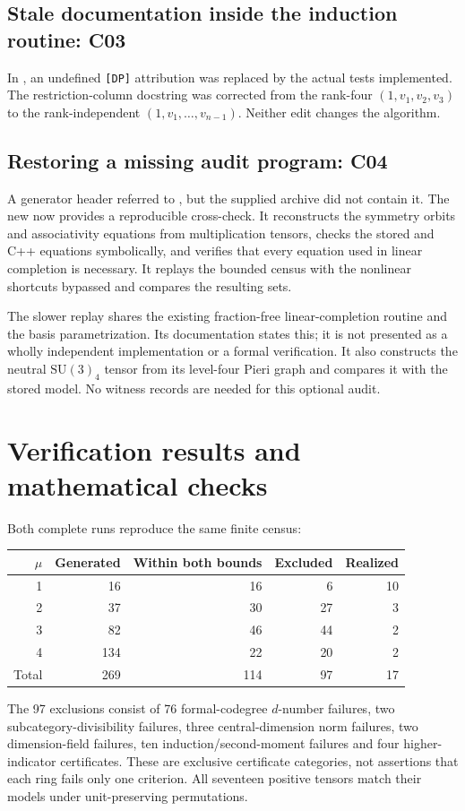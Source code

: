 \documentclass[11pt,a4paper]{article}
\begin{document}
\subsection{Stale documentation inside the induction routine: C03}

In , an undefined
\texttt{[DP]} attribution was replaced by the actual tests implemented.
The restriction-column docstring was corrected from the rank-four
$(1,v_1,v_2,v_3)$ to the rank-independent
$(1,v_1,\ldots,v_{n-1})$. Neither edit changes the algorithm.

\subsection{Restoring a missing audit program: C04}

A generator header referred to ,
but the supplied archive did not contain it. The new
 now provides a
reproducible cross-check. It reconstructs the symmetry orbits and
associativity equations from multiplication tensors, checks the stored
and C++ equations symbolically, and verifies that every equation used
in linear completion is necessary. It replays the bounded census with
the nonlinear shortcuts bypassed and compares the resulting sets.

The slower replay shares the existing fraction-free linear-completion
routine and the basis parametrization. Its documentation states this;
it is not presented as a wholly independent implementation or a formal
verification. It also constructs the neutral $\mathrm{SU}(3)_4$ tensor
from its level-four Pieri graph and compares it with the stored model.
No witness records are needed for this optional audit.

\section{Verification results and mathematical checks}

Both complete runs reproduce the same finite census:
\begin{center}
\begin{tabular}{@{}rrrrr@{}}
\toprule
$\mu$ & Generated & Within both bounds & Excluded & Realized\\\midrule
1&16&16&6&10\\
2&37&30&27&3\\
3&82&46&44&2\\
4&134&22&20&2\\\midrule
Total&269&114&97&17\\\bottomrule
\end{tabular}
\end{center}
The 97 exclusions consist of 76 formal-codegree $d$-number failures,
two subcategory-divisibility failures, three central-dimension norm
failures, two dimension-field failures, ten induction/second-moment
failures and four higher-indicator certificates. These are exclusive
certificate categories, not assertions that each ring fails only one
criterion. All seventeen positive tensors match their models under
unit-preserving permutations.
\end{document}

